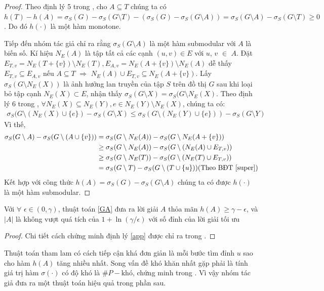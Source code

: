 \begin{proof}	
	Theo định lý 5 trong \cite{khali}, cho $A \subseteq T$ chúng ta có $h(T)-h(A)=\sigma_S(G) - \sigma_S(G \setminus T) -(\sigma_S(G) - \sigma_S(G \setminus A))  =\sigma_{S}(G \setminus A)- \sigma_{S}(G \setminus T) \geq 0$. Do đó $h(\cdot)$ là một hàm monotone. 
	
	Tiếp đến nhóm tác giả chỉ ra rằng $\sigma_S(G \setminus A)$ là một hàm submodular với $A$ là biến số. Kí hiệu $N_E(A)$ là tập tất cả các cạnh $(u, v) \in E$ với $u$, $v$ $\in$ $A$. Đặt $E_{T, v}=N_E(T+\{v\})\setminus N_E(T), E_{A, v}= N_E(A+\{v\}) \setminus N_E(A)$ dễ thấy $E_{T, v} \subseteq E_{A, v}$  nếu $A \subseteq T$ $\Rightarrow$ $N_E(A)\cup E_{T, v} \subseteq N_E(A+ \{v\})$. Lấy $\sigma_S(G \setminus N_E(X))$ là ảnh hưởng lan truyền của tập $S$ trên đồ thị $G$ sau khi loại bỏ tập cạnh $N_E(X) \subset E$, nhận thấy $\sigma_{S}(G \setminus X)=\sigma_{S}(G \setminus N_E(X)$. Theo định lý 6 trong \cite{khali}, $\forall N_E(X) \subseteq N_E(Y), e \in N_E(Y)\setminus N_E(X)$, chúng ta có: 
	\begin{align}
	\sigma_{S}(G \setminus (N_E(X) \cup \{e\}) - \sigma_{S}(G \setminus X) 
	\leq \sigma_{S}(G \setminus (N_E(Y) \cup \{e\})) - \sigma_{S}(G \setminus Y)
	\label{super}
	\end{align}
	Vì thế,
	\begin{align}
	\sigma_{S}(G \setminus A)-\sigma_{S}(G \setminus (A \cup \{v\})) 
	& =\sigma_{S}(G \setminus N_E(A))-\sigma_{S}(G \setminus N_E(A+\{v\})) 
	\\
	&	\geq \sigma_{S}(G \setminus N_E(A))-\sigma_{S}(G \setminus (N_E(A) \cup E_{T, v})) 
	\\
	&	\geq \sigma_{S}(G \setminus N_E(T))-\sigma_{S}(G \setminus (N_E(T) \cup E_{T, v}))  
	\\
	& = \sigma_{S}(G\setminus T)-\sigma_{S}(G \setminus (T \cup \{u\}))  (\mbox{Theo BĐT \eqref{super}})
	\end{align}
	Kết hợp với công thức $h(A)= \sigma_S(G)- \sigma_S(G\setminus A)$ chúng ta có được $h(\cdot)$ là một hàm submodular.
\end{proof}

\begin{theo} Với $\forall$ $\epsilon \in (0, \gamma)$, thuật toán \ref{GA} đưa ra lời giải $A$ thỏa mãn $h(A) \geq \gamma- \epsilon$, và $|A|$ là không vượt quá tích của $1+\ln(\gamma/ \epsilon)$ với số đỉnh của lời giải tối ưu \label{app}
\end{theo}		
\begin{proof}
	Chi tiết cách chứng minh định lý \ref{app} được chỉ ra trong \cite{snam}. 
\end{proof}
Thuật toán tham lam có cách tiếp cận khá đơn giản là mỗi bước tìm đỉnh $u$ sao cho hàm $h(A)$ tăng nhiều nhất. Song vấn đề khó khăn nhất gặp phải là tính giá trị hàm $\sigma(\cdot)$ có độ khó là $\#P-\text{khó}$, chứng minh trong \cite{vali}. Vì vậy nhóm tác giả đưa ra một thuật toán hiệu quả trong phần sau.

